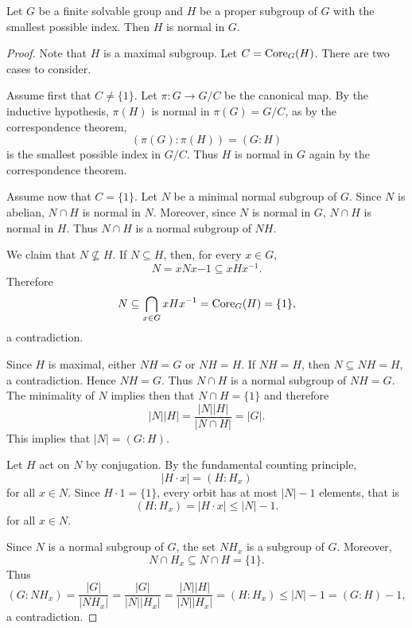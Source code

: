 \begin{theorem}[Berkovich]
\label{thm:Berkovich}
Let $G$ be a finite solvable group and $H$ be a proper subgroup of $G$ with
the smallest possible index. Then $H$ is normal in $G$. 
\end{theorem}

\begin{proof}
    Note that $H$ is a maximal subgroup. Let $C=\operatorname{Core}_G(H)$. There are two cases to consider. 

    Assume first that $C\ne\{1\}$. Let $\pi\colon G\to G/C$ be the canonical map. 
    By the inductive hypothesis, $\pi(H)$ is normal in $\pi(G)=G/C$, as by the correspondence theorem, 
    \[
    (\pi(G):\pi(H))=(G:H)
    \]
    is the smallest possible index in $G/C$. Thus $H$ is normal in $G$ again by the correspondence theorem. 

    Assume now that $C=\{1\}$. Let $N$ be a minimal normal subgroup of $G$. 
    Since $N$ is abelian, $N\cap H$ is normal in $N$. Moreover, since $N$ is normal in $G$, $N\cap H$ is normal in $H$. Thus $N\cap H$ is a normal subgroup of $NH$. 
    
    We claim that $N\not\subseteq H$. If $N\subseteq H$, 
    then, for every $x\in G$, 
    \[
        N=xNx{-1}\subseteq xHx^{-1}.
    \]
    Therefore 
    \[
    N\subseteq \bigcap_{x\in G}xHx^{-1}=\operatorname{Core}_G(H)=\{1\},
    \]
    a contradiction. 
    
    Since $H$ is maximal, either $NH=G$ or $NH=H$. If $NH=H$, then
    $N\subseteq NH=H$, a contradiction. Hence $NH=G$. Thus $N\cap H$ is a normal subgroup of $NH=G$. The minimality of $N$ implies then that 
    $N\cap H=\{1\}$ and therefore  
    \[
    |N||H|=\frac{|N||H|}{|N\cap H|}=|G|.
    \]
    This implies that $|N|=(G:H)$. 

    Let $H$ act on $N$ by conjugation. 
    By the fundamental counting principle, 
    \[
    |H\cdot x|=(H:H_x)
    \]
    for all $x\in N$. Since $H\cdot 1=\{1\}$, every orbit 
    has at most $|N|-1$ elements, that is 
    \[
    (H:H_x)=|H\cdot x|\leq |N|-1.
    \]
    for all $x\in N$. 
    
    Since $N$ is a normal subgroup of $G$, the set 
    $NH_x$ is a subgroup of $G$. 
    Moreover, 
    \[
    N\cap H_x\subseteq N\cap H=\{1\}.
    \]
    Thus 
    \[
    (G:NH_x)=\frac{|G|}{|NH_x|}=\frac{|G|}{|N||H_x|}=\frac{|N||H|}{|N||H_x|}=(H:H_x)
    \leq |N|-1=(G:H)-1,
    \]
    a contradiction. 
\end{proof}

